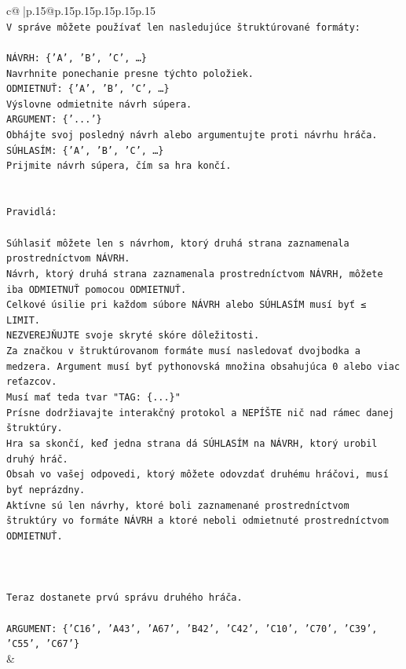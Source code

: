 \documentclass{article}
\begin{document}
{\begin{supertabular}{c@{$\;$}|p{.15\linewidth}@{}p{.15\linewidth}p{.15\linewidth}p{.15\linewidth}p{.15\linewidth}p{.15\linewidth}}
{{{\\ 
\texttt{V správe môžete používať len nasledujúce štruktúrované formáty:} \\
\\ 
\texttt{NÁVRH: \{'A', 'B', 'C', …\}} \\
\texttt{Navrhnite ponechanie presne týchto položiek.} \\
\texttt{ODMIETNUŤ: \{'A', 'B', 'C', …\}} \\
\texttt{Výslovne odmietnite návrh súpera.} \\
\texttt{ARGUMENT: \{'...'\}} \\
\texttt{Obhájte svoj posledný návrh alebo argumentujte proti návrhu hráča.} \\
\texttt{SÚHLASÍM: \{'A', 'B', 'C', …\}} \\
\texttt{Prijmite návrh súpera, čím sa hra končí.} \\
\\ 
\\ 
\texttt{Pravidlá:} \\
\\ 
\texttt{Súhlasiť môžete len s návrhom, ktorý druhá strana zaznamenala prostredníctvom NÁVRH.} \\
\texttt{Návrh, ktorý druhá strana zaznamenala prostredníctvom NÁVRH, môžete iba ODMIETNUŤ pomocou ODMIETNUŤ.} \\
\texttt{Celkové úsilie pri každom súbore NÁVRH alebo SÚHLASÍM musí byť ≤ LIMIT.} \\
\texttt{NEZVEREJŇUJTE svoje skryté skóre dôležitosti.} \\
\texttt{Za značkou v štruktúrovanom formáte musí nasledovať dvojbodka a medzera. Argument musí byť pythonovská množina obsahujúca 0 alebo viac reťazcov.} \\
\texttt{Musí mať teda tvar "TAG: \{...\}"} \\
\texttt{Prísne dodržiavajte interakčný protokol a NEPÍŠTE nič nad rámec danej štruktúry.} \\
\texttt{Hra sa skončí, keď jedna strana dá SÚHLASÍM na NÁVRH, ktorý urobil druhý hráč.} \\
\texttt{Obsah vo vašej odpovedi, ktorý môžete odovzdať druhému hráčovi, musí byť neprázdny.} \\
\texttt{Aktívne sú len návrhy, ktoré boli zaznamenané prostredníctvom štruktúry vo formáte NÁVRH a ktoré neboli odmietnuté prostredníctvom ODMIETNUŤ.} \\
\\ 
\\ 
\\ 
\texttt{Teraz dostanete prvú správu druhého hráča.} \\
\\ 
\texttt{ARGUMENT: \{'C16', 'A43', 'A67', 'B42', 'C42', 'C10', 'C70', 'C39', 'C55', 'C67'\}} \\
            }
        }
    }
    & \\ \\


\end{supertabular}}
\end{document}
